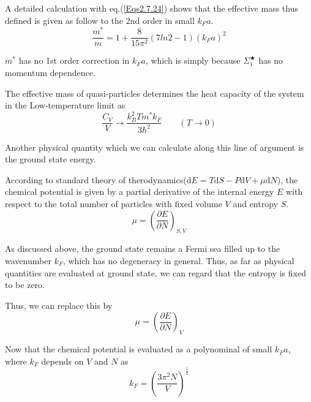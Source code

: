 A detailed calculation with eq.(\ref{Eqs2.7.24}) shows that the effective mass thus defined is given as follow to the 2nd order in small $k_F a$.
\begin{equation} \label{Eqs2.7.37}
\frac{m^{*}}{m} = 1+ \frac{8}{15\pi^2}(7 ln2 -1)(k_F a)^2
\end{equation}

$m^{*}$ has no 1st order correction in $k_F a$, which is simply because $\Sigma_1^{\bigstar}$ has no momentum dependence.

The effective mass of quasi-particles determines the heat capacity of the system in the Low-temperature limit as
\begin{equation} \label{Eqs2.7.38}
\frac{C_V}{V} \rightarrow \frac{k_B^2 T m^{*} k_F}{3\hbar^2}\qquad(T \rightarrow 0)
\end{equation}

Another physical quantity which we can calculate along this line of argument is the ground state energy.

According to standard theory of therodynamics($\mathrm{d}E=T\mathrm{d}S-P\mathrm{d}V+\mu\mathrm{d}N$), the chemical potential is given by a partial derivative of the internal energy $E$ with respect to the total number of particles with fixed volume $V$ and entropy $S$.
\begin{equation} \label{Eqs2.7.39}
\mu = \left( \frac{\partial E}{\partial N} \right)_{S,V}
\end{equation}

As discussed above, the ground state remains a Fermi sea filled up to the wavenumber $k_F$, which has no degeneracy in general. Thus, as far as physical quantities are evaluated at ground state, we can regard that the entropy is fixed to be zero.

Thus, we can replace this by
\[ \mu = \left( \frac{\partial E}{\partial N} \right)_{V} \]

Now that the chemical potential is evaluated as a polynominal of small $k_F a$, where $k_F$ depends on $V$ and $N$ as 
\begin{equation} \label{Eqs2.7.40}
k_F = \left( \frac{3\pi^2 N}{V} \right)^{\frac{1}{3}} \end{equation}

